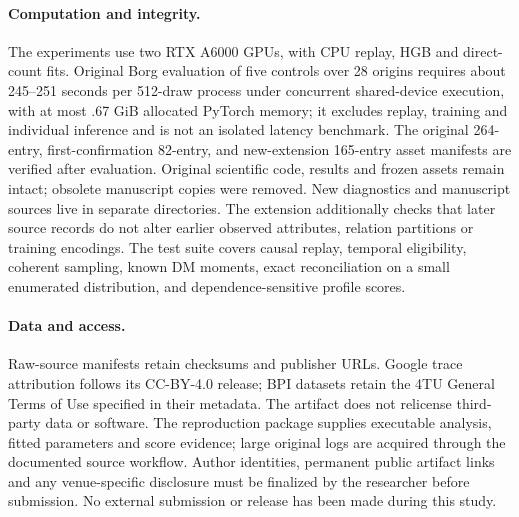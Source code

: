 \paragraph{Computation and integrity.}
The experiments use two RTX A6000 GPUs, with CPU replay, HGB and direct-count
fits. Original Borg evaluation of five controls over 28 origins requires
about 245--251 seconds per 512-draw process under concurrent shared-device
execution, with at most .67 GiB allocated PyTorch memory; it excludes replay,
training and individual inference and is not an isolated latency benchmark.
The original 264-entry, first-confirmation 82-entry, and new-extension
165-entry asset manifests are verified after evaluation. Original scientific
code, results and frozen assets remain intact; obsolete manuscript copies were
removed. New diagnostics and manuscript sources live in separate directories.
The extension additionally checks that later source records do not alter
earlier observed attributes, relation partitions or training encodings.
The test suite covers causal replay, temporal eligibility, coherent sampling,
known DM moments, exact reconciliation on a small enumerated distribution,
and dependence-sensitive profile scores.

\paragraph{Data and access.}
Raw-source manifests retain checksums and publisher URLs. Google trace
attribution follows its CC-BY-4.0 release; BPI datasets retain the 4TU General
Terms of Use specified in their metadata. The artifact does not relicense
third-party data or software. The reproduction package supplies executable
analysis, fitted parameters and score evidence; large original logs are
acquired through the documented source workflow. Author identities, permanent
public artifact links and any venue-specific disclosure must be finalized by
the researcher before submission. No external submission or release has been
made during this study.
